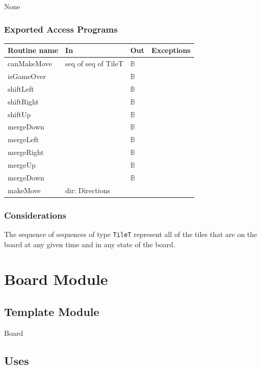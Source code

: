 \documentclass[12pt]{article}
\begin{document}
None 

\subsubsection* {Exported Access Programs}

\begin{tabular}{| l | l | l | p{6cm} |}
\hline
\textbf{Routine name} & \textbf{In} & \textbf{Out} & \textbf{Exceptions}\\
\hline
canMakeMove & seq of seq of TileT & $\mathbb{B}$ & \\
\hline
isGameOver & & $\mathbb{B}$ & \\
\hline
shiftLeft & & $\mathbb{B}$ & \\
\hline
shiftRight & & $\mathbb{B}$ & \\
\hline
shiftUp & & $\mathbb{B}$ & \\
\hline
mergeDown & & $\mathbb{B}$ & \\
\hline
mergeLeft & & $\mathbb{B}$ & \\
\hline
mergeRight & & $\mathbb{B}$ & \\
\hline
mergeUp & & $\mathbb{B}$ & \\
\hline
mergeDown & & $\mathbb{B}$ & \\
\hline
makeMove & dir: Directions &  & \\
\hline
  
\end{tabular}
    
\subsubsection* {Considerations}

The sequence of sequences of type \verb|TileT| represent all of the tiles that are on the board at any given time and in any state of the board.

\newpage

\section* {Board Module}

\subsection*{Template Module}

Board

\subsection* {Uses}
\end{document}
